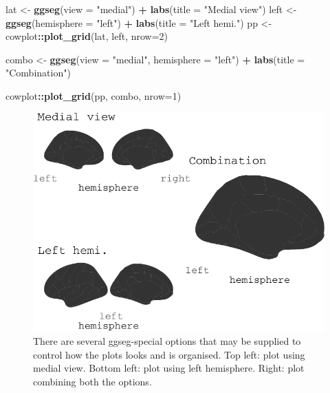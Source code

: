 \documentclass[fleqn,10pt]{wlpeerj} %
\newenvironment{Shaded}{\begin{snugshade}}{\end{snugshade}}
\newcommand{\DataTypeTok}[1]{\textcolor[rgb]{0.13,0.29,0.53}{#1}}
\newcommand{\DecValTok}[1]{\textcolor[rgb]{0.00,0.00,0.81}{#1}}
\newcommand{\KeywordTok}[1]{\textcolor[rgb]{0.13,0.29,0.53}{\textbf{#1}}}
\newcommand{\NormalTok}[1]{#1}
\newcommand{\OperatorTok}[1]{\textcolor[rgb]{0.81,0.36,0.00}{\textbf{#1}}}
\newcommand{\StringTok}[1]{\textcolor[rgb]{0.31,0.60,0.02}{#1}}
\begin{document}
\begin{Shaded}
\begin{Highlighting}[]
\NormalTok{lat <-}\StringTok{ }\KeywordTok{ggseg}\NormalTok{(}\DataTypeTok{view =} \StringTok{"medial"}\NormalTok{) }\OperatorTok{+}\StringTok{ }
\StringTok{  }\KeywordTok{labs}\NormalTok{(}\DataTypeTok{title =} \StringTok{"Medial view"}\NormalTok{)}
\NormalTok{left <-}\StringTok{ }\KeywordTok{ggseg}\NormalTok{(}\DataTypeTok{hemisphere =} \StringTok{"left"}\NormalTok{) }\OperatorTok{+}\StringTok{ }
\StringTok{  }\KeywordTok{labs}\NormalTok{(}\DataTypeTok{title =} \StringTok{"Left hemi."}\NormalTok{)}
\NormalTok{pp <-}\StringTok{ }\NormalTok{cowplot}\OperatorTok{::}\KeywordTok{plot_grid}\NormalTok{(lat, left, }\DataTypeTok{nrow=}\DecValTok{2}\NormalTok{)}

\NormalTok{combo <-}\StringTok{ }\KeywordTok{ggseg}\NormalTok{(}\DataTypeTok{view =} \StringTok{"medial"}\NormalTok{,}
      \DataTypeTok{hemisphere =} \StringTok{"left"}\NormalTok{) }\OperatorTok{+}\StringTok{ }
\StringTok{  }\KeywordTok{labs}\NormalTok{(}\DataTypeTok{title =} \StringTok{"Combination"}\NormalTok{)}

\NormalTok{cowplot}\OperatorTok{::}\KeywordTok{plot_grid}\NormalTok{(pp, combo, }\DataTypeTok{nrow=}\DecValTok{1}\NormalTok{)}
\end{Highlighting}
\end{Shaded}

\begin{figure}
\centering
\includegraphics{draft_1_files/figure-latex/stacked-1.pdf}
\caption{\label{fig:stacked}There are several ggseg-special options that may be supplied to control how the plots looks and is organised. Top left: plot using medial view. Bottom left: plot using left hemisphere. Right: plot combining both the options.}
\end{figure}
\end{document}
